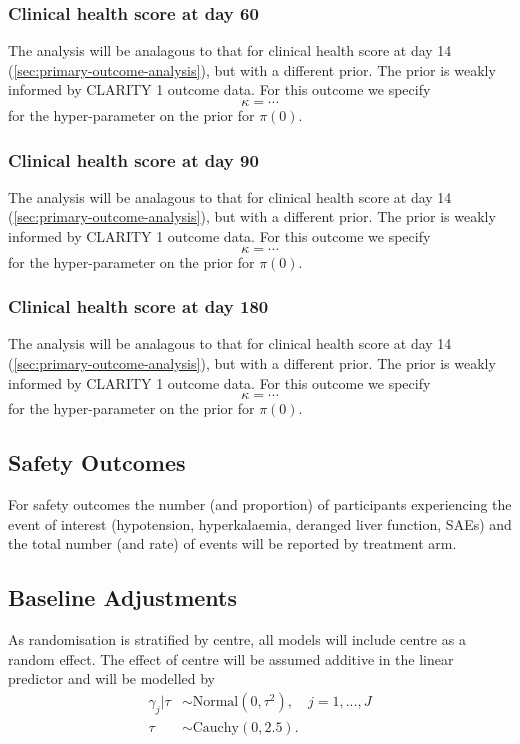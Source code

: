 \documentclass[11pt,parskip=half-]{scrartcl}
\begin{document}
\subsubsection{Clinical health score at day 60}
The analysis will be analagous to that for clinical health score at day 14 (\ref{sec:primary-outcome-analysis}), but with a different prior. The prior is weakly informed by CLARITY 1 outcome data. For this outcome we specify
$$
    \kappa = \cdots
$$
for the hyper-parameter on the prior for $\pi(0)$.

\subsubsection{Clinical health score at day 90}
The analysis will be analagous to that for clinical health score at day 14 (\ref{sec:primary-outcome-analysis}), but with a different prior. The prior is weakly informed by CLARITY 1 outcome data. For this outcome we specify
$$
    \kappa = \cdots
$$
for the hyper-parameter on the prior for $\pi(0)$.

\subsubsection{Clinical health score at day 180}
The analysis will be analagous to that for clinical health score at day 14 (\ref{sec:primary-outcome-analysis}), but with a different prior. The prior is weakly informed by CLARITY 1 outcome data. For this outcome we specify
$$
    \kappa = \cdots
$$
for the hyper-parameter on the prior for $\pi(0)$.

\subsection{Safety Outcomes}

For safety outcomes the number (and proportion) of participants experiencing the event of interest (hypotension, hyperkalaemia, deranged liver function, SAEs) and the total number (and rate) of events will be reported by treatment arm.


\subsection{Baseline Adjustments}
As randomisation is stratified by centre, all models will include centre as a random effect. The effect of centre will be assumed additive in the linear predictor and will be modelled by
$$
    \begin{aligned}
        \gamma_j|\tau & \sim \text{Normal}(0, \tau^2), \quad j =1,...,J \\
        \tau          & \sim \text{Cauchy}(0, 2.5).
    \end{aligned}
$$
\end{document}
